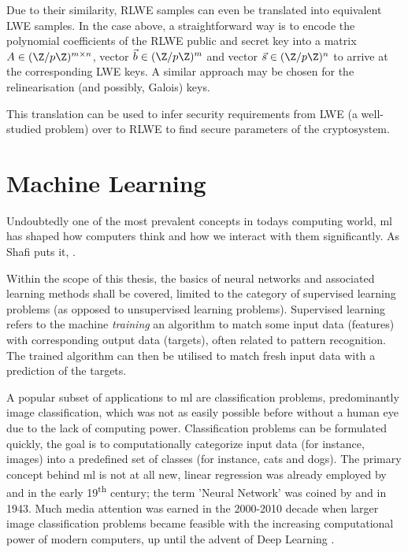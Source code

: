 Due to their similarity, RLWE samples can even be translated into equivalent LWE samples.
In the case above, a straightforward way is to encode the polynomial coefficients of the RLWE public and secret key into a matrix $A \in (\Z/p\Z)^{m \times n}$, vector $\vec{b} \in (\Z/p\Z)^m$ and vector $\vec{s} \in (\Z/p\Z)^n$ to arrive at the corresponding LWE keys.
A similar approach may be chosen for the relinearisation (and possibly, Galois) keys.

This translation can be used to infer security requirements from LWE (a well-studied problem) over to RLWE to find secure parameters of the cryptosystem.

\pagebreak
\section{Machine Learning}
\label{sec:machine-learning}
Undoubtedly one of the most prevalent concepts in todays computing world, \gls{ml} has shaped how computers think and how we interact with them significantly.
As Shafi  puts it, .

Within the scope of this thesis, the basics of neural networks and associated learning methods shall be covered, limited to the category of supervised learning problems (as opposed to unsupervised learning problems).
Supervised learning refers to the machine \textit{training} an algorithm to match some input data (features) with corresponding output data (targets), often related to pattern recognition.
The trained algorithm can then be utilised to match fresh input data with a prediction of the targets.

A popular subset of applications to \gls{ml} are classification problems, predominantly image classification, which was not as easily possible before without a human eye due to the lack of computing power.
Classification problems can be formulated quickly, the goal is to computationally categorize input data (for instance, images) into a predefined set of classes (for instance, cats and dogs).
The primary concept behind \acrlong{ml} is not at all new, linear regression was already employed by  and  in the early 19\textsuperscript{th} century; the term 'Neural Network' was coined by  and  in 1943.
Much media attention was earned in the 2000-2010 decade when larger image classification problems became feasible with the increasing computational power of modern computers, up until the advent of Deep Learning \parencite{bishop-pattern-recognition-and-ml}.

